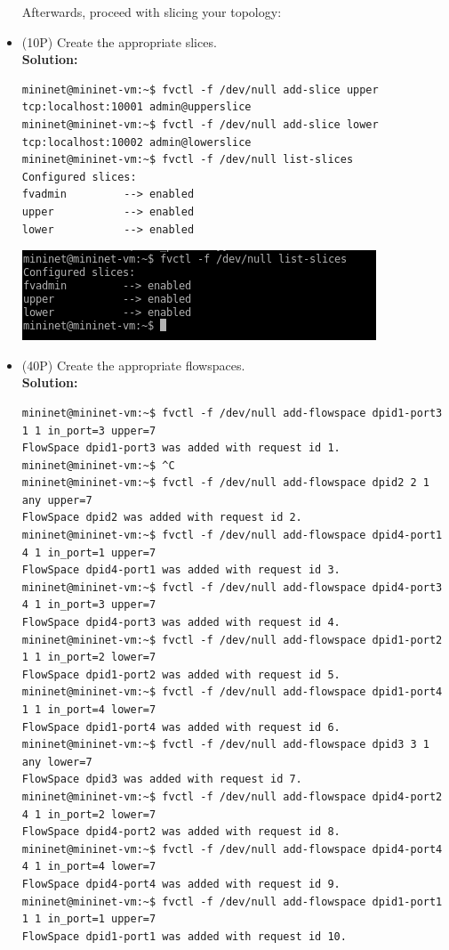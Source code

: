\documentclass{llncs}
\begin{document}
\begin{itemize}
Afterwards, proceed with slicing your topology:

\item (10P) Create the appropriate slices.\\
\textbf{Solution: }
\begin{lstlisting}
mininet@mininet-vm:~$ fvctl -f /dev/null add-slice upper tcp:localhost:10001 admin@upperslice
mininet@mininet-vm:~$ fvctl -f /dev/null add-slice lower tcp:localhost:10002 admin@lowerslice
mininet@mininet-vm:~$ fvctl -f /dev/null list-slices
Configured slices:
fvadmin         --> enabled 
upper           --> enabled 
lower           --> enabled
\end{lstlisting}
\includegraphics[scale=1]{images/8-7.png} 

\item (40P) Create the appropriate flowspaces. \\
\textbf{Solution: }
\begin{lstlisting}
mininet@mininet-vm:~$ fvctl -f /dev/null add-flowspace dpid1-port3 1 1 in_port=3 upper=7
FlowSpace dpid1-port3 was added with request id 1.
mininet@mininet-vm:~$ ^C
mininet@mininet-vm:~$ fvctl -f /dev/null add-flowspace dpid2 2 1 any upper=7
FlowSpace dpid2 was added with request id 2.
mininet@mininet-vm:~$ fvctl -f /dev/null add-flowspace dpid4-port1 4 1 in_port=1 upper=7
FlowSpace dpid4-port1 was added with request id 3.
mininet@mininet-vm:~$ fvctl -f /dev/null add-flowspace dpid4-port3 4 1 in_port=3 upper=7
FlowSpace dpid4-port3 was added with request id 4.
mininet@mininet-vm:~$ fvctl -f /dev/null add-flowspace dpid1-port2 1 1 in_port=2 lower=7
FlowSpace dpid1-port2 was added with request id 5.
mininet@mininet-vm:~$ fvctl -f /dev/null add-flowspace dpid1-port4 1 1 in_port=4 lower=7
FlowSpace dpid1-port4 was added with request id 6.
mininet@mininet-vm:~$ fvctl -f /dev/null add-flowspace dpid3 3 1 any lower=7
FlowSpace dpid3 was added with request id 7.
mininet@mininet-vm:~$ fvctl -f /dev/null add-flowspace dpid4-port2 4 1 in_port=2 lower=7
FlowSpace dpid4-port2 was added with request id 8.
mininet@mininet-vm:~$ fvctl -f /dev/null add-flowspace dpid4-port4 4 1 in_port=4 lower=7
FlowSpace dpid4-port4 was added with request id 9.
mininet@mininet-vm:~$ fvctl -f /dev/null add-flowspace dpid1-port1 1 1 in_port=1 upper=7
FlowSpace dpid1-port1 was added with request id 10.
\end{lstlisting}


\end{itemize}
\end{document}
